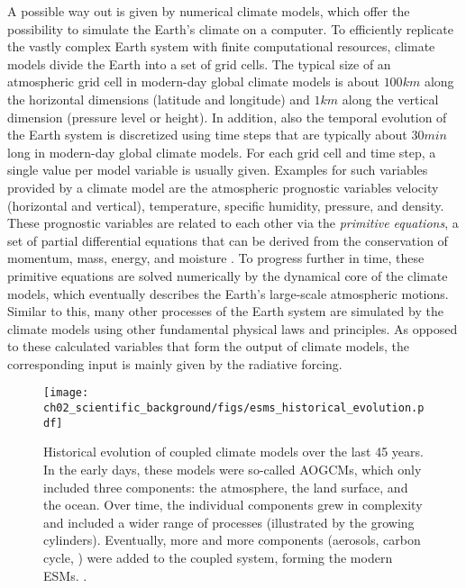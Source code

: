 A possible way out is given by numerical climate models, which offer the
possibility to simulate the Earth's climate on a computer. To efficiently
replicate the vastly complex Earth system with finite computational resources,
climate models divide the Earth into a set of grid cells. The typical size of
an atmospheric grid cell in modern-day global climate models is about $100
\unit{km}$ along the horizontal dimensions (latitude and longitude) and $1
\unit{km}$ along the vertical dimension (pressure level or height). In
addition, also the temporal evolution of the Earth system is discretized using
time steps that are typically about $30 \unit{min}$ long in modern-day global
climate models. For each grid cell and time step, a single value per model
variable is usually given. Examples for such variables provided by a climate
model are the atmospheric prognostic variables velocity (horizontal and
vertical), temperature, specific humidity, pressure, and density. These
prognostic variables are related to each other via the \emph{primitive
  equations}, a set of partial differential equations that can be derived from
the conservation of momentum, mass, energy, and moisture \autocite{Holton2004}.
To progress further in time, these primitive equations are solved numerically
by the dynamical core of the climate models, which eventually describes the
Earth's large-scale atmospheric motions. Similar to this, many other processes
of the Earth system are simulated by the climate models using other fundamental
physical laws and principles. As opposed to these calculated variables that
form the output of climate models, the corresponding input is mainly given by
the radiative forcing.

\begin{figure}[t]
  \centering
  \texttt{[image: 
    ch02\_scientific\_background/figs/esms\_historical\_evolution.pdf]}
  \caption[
    Historical evolution of coupled climate models over the last 45 years.
  ]{
    Historical evolution of coupled climate models over the last 45 years. In
    the early days, these models were so-called \acfp{AOGCM}, which only
    included three components: the atmosphere, the land surface, and the ocean.
    Over time, the individual components grew in complexity and included a
    wider range of processes (illustrated by the growing cylinders).
    Eventually, more and more components (aerosols, carbon cycle, \etc{}) were
    added to the coupled system, forming the modern \acfp{ESM}.
    .
  }
  \label{fig:02:esms_historical_evolution}
\end{figure}

